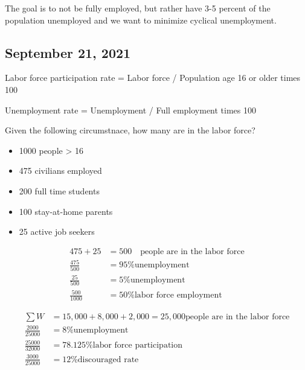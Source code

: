 \documentclass{scrreprt} %
\begin{document}
\begin{remark}
	The goal is to not be fully employed, but rather have 3-5 percent of the population
	unemployed and we want to minimize cyclical unemployment.
\end{remark}

\subsection{September 21, 2021}

\begin{definition}
	Labor force participation rate = Labor force / Population age 16 or older times 100

	Unemployment rate = Unemployment / Full employment times 100
\end{definition}

\begin{example}
	Given the following circumstnace, how many are in the labor force?

	\begin{itemize}
		\item 1000 people > 16
		\item 475 civilians employed
		\item 200 full time students
		\item 100 stay-at-home parents
		\item 25 active job seekers
	\end{itemize}

	\begin{align*}
		475 + 25 &= 500 \quad \text{people are in the labor force} \\
		\frac{475}{500} &= 95 \text{\% unemployment} \\
		\frac{25}{500} &= 5 \text{\% unemployment} \\
		\frac{500}{1000} &= 50 \text{\% labor force employment}
	\end{align*}

	\begin{align*}
		\sum W &= 15,000 + 8,000 + 2,000 = 25,000 \text{people are in the labor force} \\
		\frac{2000}{25000} &= 8 \text{\% unemployment} \\
		\frac{25000}{32000} &= 78.125 \text{\% labor force participation} \\
		\frac{3000}{25000} &= 12 \text{\% discouraged rate}
	\end{align*}
\end{example}
\end{document}
